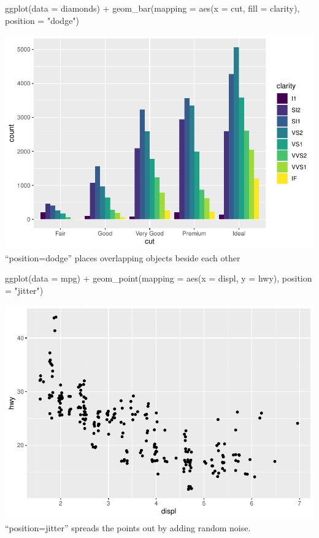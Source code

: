 \documentclass[
]{article}
\newenvironment{Shaded}{\begin{snugshade}}{\end{snugshade}}
\newcommand{\AttributeTok}[1]{\textcolor[rgb]{0.77,0.63,0.00}{#1}}
\newcommand{\FunctionTok}[1]{\textcolor[rgb]{0.00,0.00,0.00}{#1}}
\newcommand{\NormalTok}[1]{#1}
\newcommand{\SpecialCharTok}[1]{\textcolor[rgb]{0.00,0.00,0.00}{#1}}
\newcommand{\StringTok}[1]{\textcolor[rgb]{0.31,0.60,0.02}{#1}}
\begin{document}
\begin{Shaded}
\begin{Highlighting}[]
\FunctionTok{ggplot}\NormalTok{(}\AttributeTok{data =}\NormalTok{ diamonds) }\SpecialCharTok{+} 
  \FunctionTok{geom\_bar}\NormalTok{(}\AttributeTok{mapping =} \FunctionTok{aes}\NormalTok{(}\AttributeTok{x =}\NormalTok{ cut, }\AttributeTok{fill =}\NormalTok{ clarity), }\AttributeTok{position =} \StringTok{"dodge"}\NormalTok{)}
\end{Highlighting}
\end{Shaded}

\includegraphics{Assignments_files/figure-latex/unnamed-chunk-51-1.pdf}
``position=dodge'' places overlapping objects beside each other

\begin{Shaded}
\begin{Highlighting}[]
\FunctionTok{ggplot}\NormalTok{(}\AttributeTok{data =}\NormalTok{ mpg) }\SpecialCharTok{+} 
  \FunctionTok{geom\_point}\NormalTok{(}\AttributeTok{mapping =} \FunctionTok{aes}\NormalTok{(}\AttributeTok{x =}\NormalTok{ displ, }\AttributeTok{y =}\NormalTok{ hwy), }\AttributeTok{position =} \StringTok{"jitter"}\NormalTok{)}
\end{Highlighting}
\end{Shaded}

\includegraphics{Assignments_files/figure-latex/unnamed-chunk-52-1.pdf}
``position=jitter'' spreads the points out by adding random noise.
\end{document}
